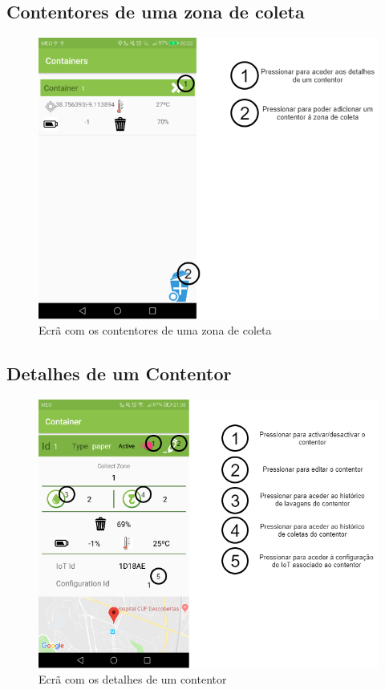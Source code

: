 \documentclass[10pt,a5paper]{article}
\begin{document}
\newpage
\subsection{Contentores de uma zona de coleta} 

\begin{figure}[!h]
	\centering
	\includegraphics[width=1.1\textwidth]{Images/screens/collect_zones_containers_screen}
	\caption{Ecrã com os contentores de uma zona de coleta}
	\label{fig:collect_zones_containers_screen}
\end{figure}

\newpage
\subsection{Detalhes de um Contentor} 
\begin{figure}[!h]
	\centering
	\includegraphics[width=1.1\textwidth]{Images/screens/container_screen}
	\caption{Ecrã com os detalhes de um contentor}
	\label{fig:container_screen}
\end{figure}
\end{document}

